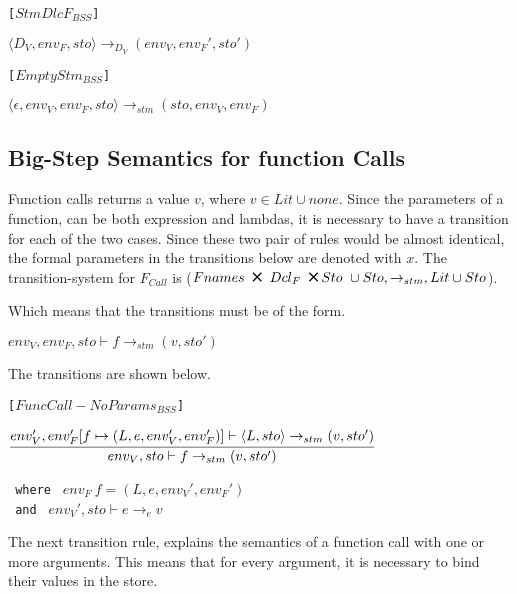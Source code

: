 \texttt{[$StmDlcF_{BSS}$]}
\begin{center}
	$\langle D_V, env_F, sto \rangle \rightarrow_{D_V} (env_V, env_F', sto')$
\end{center}

\texttt{[$EmptyStm_{BSS}$]}
\begin{center}
	\begin{math}
	{\langle \epsilon, env_V, env_F, sto \rangle \rightarrow_{stm} (sto, env_V, env_F)}
	\end{math}
\end{center}

\subsection{Big-Step Semantics for function Calls}
Function calls returns a value $v$, where $v \in Lit \cup {none}$.
Since the parameters of a function, can be both expression and lambdas, it is necessary to have a transition for each of the two cases.
Since these two pair of rules would be almost identical, the formal parameters in the transitions below are denoted with $x$.
The transition-system for $F_{Call}$ is ($Fnames\ \Cross\ Dcl_F\ \Cross Sto\ \cup Sto, \rightarrow_{stm}, Lit \cup Sto$).

Which means that the transitions must be of the form.
\begin{center}
	$env_V, env_F, sto \vdash f \rightarrow_{stm} (v, sto')$
\end{center}
The transitions are shown below.

\texttt{[$FuncCall-NoParams_{BSS}$]}
\begin{center}
	\begin{math}
	\cfrac
		{env_V', env_F'[f \mapsto (L, e, env_V', env_F')] \vdash \langle L, sto \rangle \rightarrow_{stm} (v, sto')}
		{env_V, sto \vdash f \rightarrow_{stm} (v, sto')}
	\end{math}
	
	\texttt{ where } $env_F\ f = (L, e, env_V', env_F')$\\
	\texttt{ and } $ env_V', sto \vdash e \rightarrow_{e} v$\\
\end{center}

The next transition rule, explains the semantics of a function call with one or more arguments.
This means that for every argument, it is necessary to bind their values in the store.

